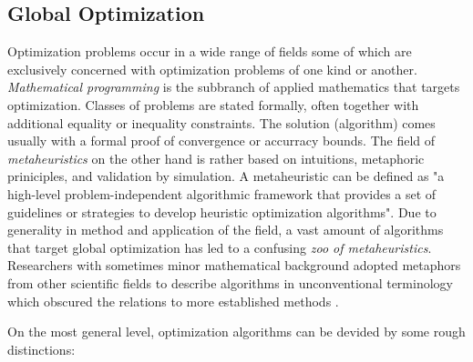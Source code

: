 \documentclass[english]{article}
\begin{document}
\subsection{Global Optimization}
Optimization problems occur in a wide range of fields some of which are exclusively concerned with optimization problems of one kind or another. \textit{Mathematical programming} is the subbranch of applied mathematics that targets optimization. Classes of problems are stated formally, often together with additional equality or inequality constraints. The solution (algorithm) comes usually with a formal proof of convergence or accurracy bounds. The field of \textit{metaheuristics}
on the other hand is rather based on intuitions, metaphoric priniciples, and validation by simulation. A metaheuristic can be defined as "a high-level problem-independent algorithmic framework that provides a set of guidelines or strategies to develop heuristic optimization algorithms"\cite{sorensen_history_2014}. Due to generality in method and application of the field, a vast amount of algorithms that target global optimization has led to a confusing \textit{zoo of metaheuristics}. Researchers with sometimes minor mathematical background adopted metaphors from other scientific fields to describe algorithms in unconventional terminology which obscured the relations to more established methods \cite{sorensen_metaheuristics-metaphor_2015}.


On the most general level, optimization algorithms can be devided by some rough distinctions:
\end{document}
